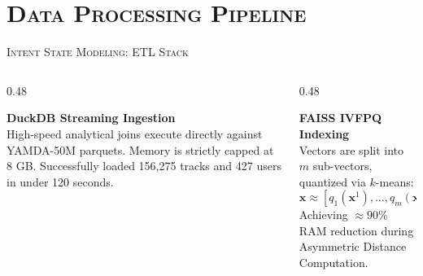 \documentclass[xcolor=dvipsnames, aspectratio=1610]{beamer}
\begin{document}
\section{\textsc{Data Processing Pipeline}}
\begin{frame}{\textsc{Intent State Modeling: ETL Stack}}

  \begin{columns}[T]
    \begin{column}{0.48\textwidth}
      \begin{ExampleBox}
        \textbf{DuckDB Streaming Ingestion} \\
        High-speed analytical joins execute directly against YAMDA-50M parquets. Memory is strictly capped at 8 GB. Successfully loaded 156,275 tracks and 427 users in under 120 seconds.
      \end{ExampleBox}
    \end{column}
    \begin{column}{0.48\textwidth}
      \begin{CommentBox}
        \textbf{FAISS IVFPQ Indexing} \\
        Vectors are split into $m$ sub-vectors, quantized via $k$-means:
        \begin{equation}
            \mathbf{x} \approx [q_1(\mathbf{x}^1), \dots, q_m(\mathbf{x}^m)]
        \end{equation}
        Achieving $\approx 90\%$ RAM reduction during Asymmetric Distance Computation.
      \end{CommentBox}
    \end{column}
  \end{columns}

\end{frame}

\end{document}
